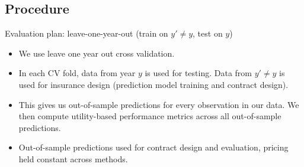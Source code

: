 \documentclass{beamer}
\begin{document}
\subsection{Procedure}
\begin{frame}{Evaluation plan: leave-one-year-out (train on $y' \neq y$, test on $y$)}
    \begin{itemize}
        \setlength\itemsep{2em}
        \item We use leave one year out cross validation. 
        \item In each CV fold, data from year $y$ is used for testing. Data from $y'\neq y$ is used for insurance design (prediction model training and contract design).
        \item This gives us out-of-sample predictions for every observation in our data. We then compute utility-based performance metrics across all out-of-sample predictions. 
        \item Out-of-sample predictions used for contract design and evaluation, pricing held constant across methods. 
    \end{itemize}
\end{frame}

    



  
\end{document}
